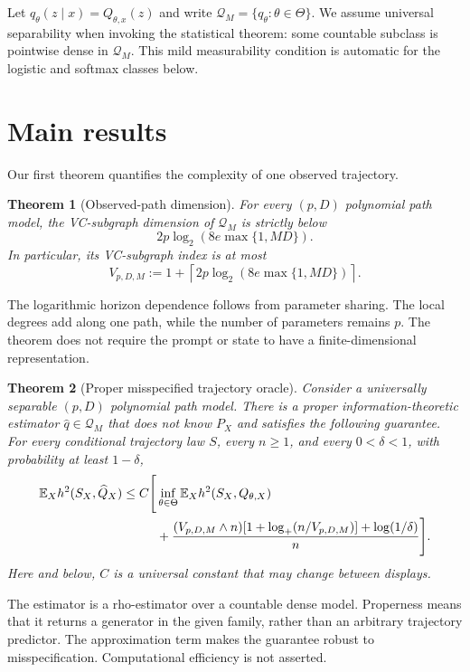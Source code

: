 \documentclass{article}
\newtheorem{theorem}{Theorem}
\theoremstyle{definition}
\theoremstyle{remark}
\newcommand{\E}{\mathbb E}
\newcommand{\cQ}{\mathcal Q}
\begin{document}
Let $q_\theta(z\mid x)=Q_{\theta,x}(z)$ and write $\cQ_M=\{q_\theta:\theta\in\Theta\}$. We assume universal separability when invoking the statistical theorem: some countable subclass is pointwise dense in $\cQ_M$. This mild measurability condition is automatic for the logistic and softmax classes below.

\section{Main results}
\label{sec:results}

Our first theorem quantifies the complexity of one observed trajectory.

\begin{theorem}[Observed-path dimension]
\label{thm:path-dimension}
For every $(p,D)$ polynomial path model, the VC-subgraph dimension of $\cQ_M$ is strictly below \[ 2p\log_2\!\left(8e\max\{1,MD\}\right). \] In particular, its VC-subgraph index is at most \[ V_{p,D,M}:=1+\left\lceil2p\log_2\!\left(8e\max\{1,MD\}\right)\right\rceil. \]
\end{theorem}

The logarithmic horizon dependence follows from parameter sharing. The local degrees add along one path, while the number of parameters remains $p$. The theorem does not require the prompt or state to have a finite-dimensional representation.

\begin{theorem}[Proper misspecified trajectory oracle]
\label{thm:rho-oracle}
Consider a universally separable $(p,D)$ polynomial path model. There is a proper information-theoretic estimator $\widehat q\in\cQ_M$ that does not know $P_X$ and satisfies the following guarantee. For every conditional trajectory law $S$, every $n\ge1$, and every $0<\delta<1$, with probability at least $1-\delta$,
\begin{align}
\E_Xh^2(S_X,\widehat Q_X)
\le C\Bigg[&\inf_{\theta\in\Theta}\E_Xh^2(S_X,Q_{\theta,X}) \notag\\
&+\frac{(V_{p,D,M}\wedge n)[1+\log_+(n/V_{p,D,M})]+\log(1/\delta)}{n}\Bigg].
\label{eq:oracle}
\end{align}
Here and below, $C$ is a universal constant that may change between displays.
\end{theorem}

The estimator is a rho-estimator over a countable dense model. Properness means that it returns a generator in the given family, rather than an arbitrary trajectory predictor. The approximation term makes the guarantee robust to misspecification. Computational efficiency is not asserted.
\end{document}
